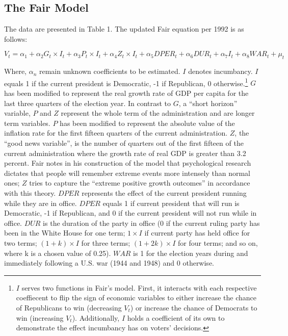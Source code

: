 \documentclass[11,]{article}
\let\rmarkdownfootnote\footnote%
\def\footnote{\protect\rmarkdownfootnote}
\begin{document}
\hypertarget{the-fair-model}{%
\subsection{The Fair Model}\label{the-fair-model}}

The data are presented in Table 1. The updated Fair equation per 1992 is
as follows:

\[ V_t = \alpha_1 + \alpha_2 G_t\times I_t + \alpha_3 P_t\times I_t + \alpha_4 Z_t\times I_t + \alpha_5 {DPER_t} + \alpha_6 {DUR_t} +\alpha_7 I_t + \alpha_8 {WAR_t} + \mu_t \]

Where, \(\alpha_n\) remain unknown coefficients to be estimated. \(I\)
denotes incumbancy. \(I\) equals 1 if the current president is
Democratic, -1 if Republican, 0 otherwise.\footnote{\(I\) serves two
  functions in Fair's model. First, it interacts with each respective
  coeffiecent to flip the sign of economic variables to either increase
  the chance of Republicans to win (decreasing \(V_t\)) or increase the
  chance of Democrats to win (increasing \(V_t\)). Additionally, \(I\)
  holds a coefficient of its own to demonstrate the effect incumbancy
  has on voters' decisions.} \(G\) has been modified to represent the
real growth rate of GDP per capita for the last three quarters of the
election year. In contrast to \(G\), a ``short horizon'' variable, \(P\)
and \(Z\) represent the whole term of the administration and are longer
term variables. \(P\) has been modified to represent the absolute value
of the inflation rate for the first fifteen quarters of the current
administration. \(Z\), the ``good news variable'', is the number of
quarters out of the first fifteen of the current administration where
the growth rate of real GDP is greater than 3.2 percent. Fair notes in
his construction of the model that psychological research dictates that
people will remember extreme events more intensely than normal ones;
\(Z\) tries to capture the ``extreme positive growth outcomes'' in
accordance with this theory. \(DPER\) represents the effect of the
current president running while they are in office. \(DPER\) equals 1 if
current president that will run is Democratic, -1 if Republican, and 0
if the current president will not run while in office. \(DUR\) is the
duration of the party in office (0 if the current ruling party has been
in the White House for one term; \(1\times I\) if current party has held
office for two terms; \((1+k) \times I\) for three terms;
\((1+2k)\times I\) for four terms; and so on, where k is a chosen value
of 0.25). \(WAR\) is 1 for the election years during and immediately
following a U.S. war (1944 and 1948) and 0 otherwise.
\end{document}
